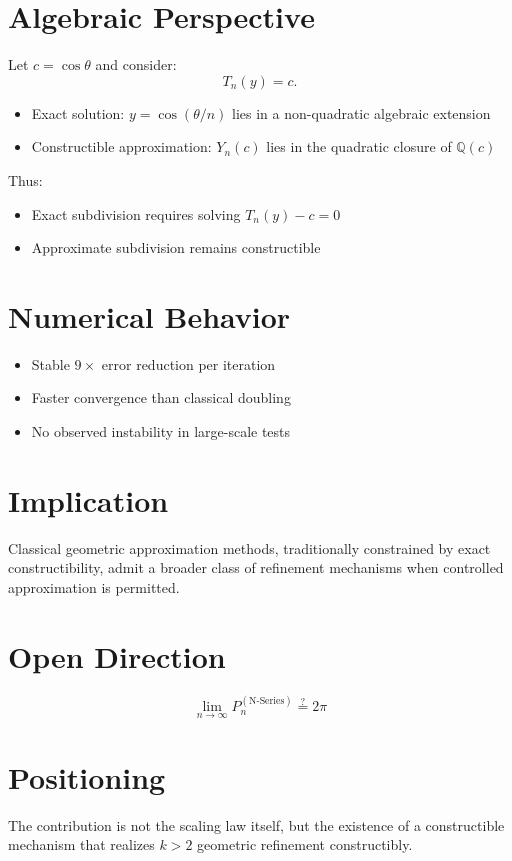 \documentclass[12pt]{article}
\begin{document}
\section*{Algebraic Perspective}

Let $c = \cos\theta$ and consider:
\[
T_n(y) = c.
\]

\begin{itemize}
\item Exact solution: $y = \cos(\theta/n)$ lies in a non-quadratic algebraic extension
\item Constructible approximation: $Y_n(c)$ lies in the quadratic closure of $\mathbb{Q}(c)$
\end{itemize}

Thus:
\begin{itemize}
\item Exact subdivision requires solving $T_n(y) - c = 0$
\item Approximate subdivision remains constructible
\end{itemize}

\section*{Numerical Behavior}

\begin{itemize}
\item Stable $9\times$ error reduction per iteration
\item Faster convergence than classical doubling
\item No observed instability in large-scale tests
\end{itemize}

\section*{Implication}

Classical geometric approximation methods, traditionally constrained
by exact constructibility, admit a broader class of refinement mechanisms
when controlled approximation is permitted.

\section*{Open Direction}

\[
\lim_{n \to \infty} P_n^{(\text{N-Series})}
\stackrel{?}{=} 2\pi
\]

\section*{Positioning}

The contribution is not the scaling law itself, but the existence of a
constructible mechanism that realizes $k>2$ geometric refinement constructibly.
\end{document}
